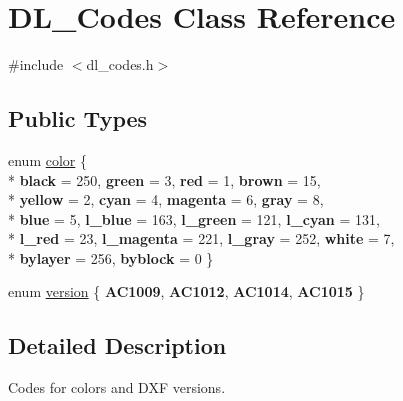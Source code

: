 \hypertarget{classDL__Codes}{\section{D\-L\-\_\-\-Codes Class Reference}
\label{classDL__Codes}
}


{\ttfamily \#include $<$dl\-\_\-codes.\-h$>$}

\subsection*{Public Types}
\begin{DoxyCompactItemize}
\item 
enum \hyperlink{classDL__Codes_af9168b178c93c91b220ddf8c1414a552}{color} \{ \\*
{\bfseries black} = 250, 
{\bfseries green} = 3, 
{\bfseries red} = 1, 
{\bfseries brown} = 15, 
\\*
{\bfseries yellow} = 2, 
{\bfseries cyan} = 4, 
{\bfseries magenta} = 6, 
{\bfseries gray} = 8, 
\\*
{\bfseries blue} = 5, 
{\bfseries l\-\_\-blue} = 163, 
{\bfseries l\-\_\-green} = 121, 
{\bfseries l\-\_\-cyan} = 131, 
\\*
{\bfseries l\-\_\-red} = 23, 
{\bfseries l\-\_\-magenta} = 221, 
{\bfseries l\-\_\-gray} = 252, 
{\bfseries white} = 7, 
\\*
{\bfseries bylayer} = 256, 
{\bfseries byblock} = 0
 \}
\item 
enum \hyperlink{classDL__Codes_a5eba107e2d280c70b52ffab0292fb9dc}{version} \{ {\bfseries A\-C1009}, 
{\bfseries A\-C1012}, 
{\bfseries A\-C1014}, 
{\bfseries A\-C1015}
 \}
\end{DoxyCompactItemize}


\subsection{Detailed Description}
Codes for colors and D\-X\-F versions. 

